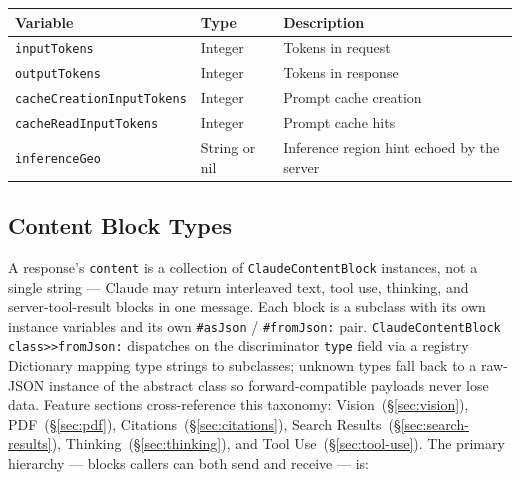 \documentclass[a4paper,10pt,fleqn]{article}
\newcommand{\cls}[1]{\texttt{#1}}
\newcommand{\sel}[1]{\texttt{\##1}}
\begin{document}
\begin{center}
\small
\begin{tabular}{@{}llp{5.5cm}@{}}
\toprule
\textbf{Variable} & \textbf{Type} & \textbf{Description} \\
\midrule
\texttt{inputTokens}              & Integer          & Tokens in request \\
\texttt{outputTokens}             & Integer          & Tokens in response \\
\texttt{cacheCreationInputTokens} & Integer          & Prompt cache creation \\
\texttt{cacheReadInputTokens}     & Integer          & Prompt cache hits \\
\texttt{inferenceGeo}             & String or nil    & Inference region hint echoed by the server \\
\bottomrule
\end{tabular}
\end{center}

\subsection{Content Block Types}
\label{sec:content-blocks}

A response's \texttt{content} is a collection of
\cls{ClaudeContentBlock} instances, not a single string ---
Claude may return interleaved text, tool use, thinking, and
server-tool-result blocks in one message.  Each block is a
subclass with its own instance variables and its own
\sel{asJson} / \sel{fromJson:} pair.
\texttt{ClaudeContentBlock class>>fromJson:} dispatches on the
discriminator \texttt{type} field via a registry Dictionary
mapping type strings to subclasses; unknown types fall back to
a raw-JSON instance of the abstract class so forward-compatible
payloads never lose data.  Feature sections cross-reference this
taxonomy: Vision~(\S\ref{sec:vision}), PDF~(\S\ref{sec:pdf}),
Citations~(\S\ref{sec:citations}), Search
Results~(\S\ref{sec:search-results}),
Thinking~(\S\ref{sec:thinking}), and Tool
Use~(\S\ref{sec:tool-use}).  The primary hierarchy --- blocks
callers can both send and receive --- is:
\end{document}
